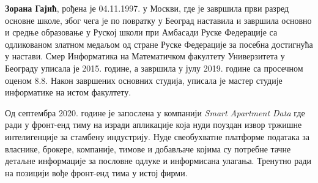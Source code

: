 \documentclass[12pt,oneside]{memoir}
\begin{document}
\literatura

\backmatter

\begin{biografija}
\textbf{Зорана Гајић}, рођена је 04.11.1997. у Москви, где је завршила први разред основне школе, због чега је по повратку у Београд наставила и завршила основно и средње образовање у Руској школи при Амбасади Руске Федерације са одликованом златном медаљом од стране Руске Федерације за посебна достигнућа у настави. Смер Информатика на Математичком факултету Универзитета у Београду уписала је 2015. године, а завршила у јулу 2019. године са просечном оценом 8.8. Након завршених основних студија, уписала је мастер студије информатике на истом факултету.

Од септембра 2020. године је запослена у компанији \textit{Smart Apartment Data} где ради у фронт-енд тиму на изради апликације која нуди поуздан извор тржишне интелигенције за стамбену индустрију. Нуде свеобухватне платформе података за власнике, брокере, компаније, тимове и добављаче којима су потребне тачне детаљне информације за пословне одлуке и информисана улагања. Тренутно ради на позицији вође фронт-енд тима у истој фирми.
\end{biografija}
\end{document}
